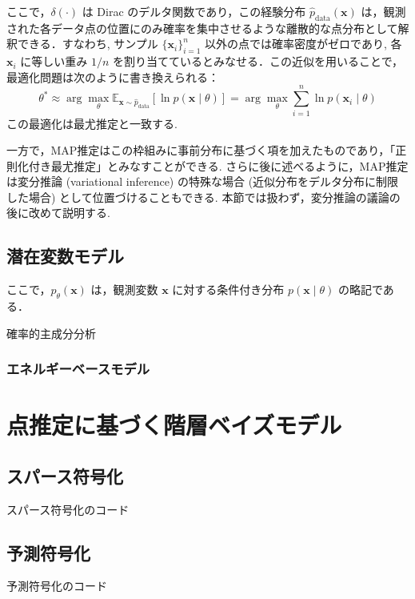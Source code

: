 \documentclass[titlepage]{ltjsbook}
\begin{document}
ここで，$\delta(\cdot)$ は Dirac のデルタ関数であり，この経験分布 $\hat{p}_{\mathrm{data}}(\mathbf{x})$ は，観測された各データ点の位置にのみ確率を集中させるような離散的な点分布として解釈できる．すなわち, サンプル $\{\mathbf{x}_i\}_{i=1}^n$ 以外の点では確率密度がゼロであり, 各 $\mathbf{x}_i$ に等しい重み $1/n$ を割り当てているとみなせる．この近似を用いることで，最適化問題は次のように書き換えられる：
\begin{equation}
\theta^* \approx \arg\max_\theta \mathbb{E}_{\mathbf{x} \sim \hat{p}_{\mathrm{data}}} \left[ \ln p(\mathbf{x}\mid \theta) \right]
= \arg\max_\theta \sum_{i=1}^n \ln p(\mathbf{x}_i \mid \theta)
\end{equation}
この最適化は最尤推定と一致する. 

一方で，MAP推定はこの枠組みに事前分布に基づく項を加えたものであり，「正則化付き最尤推定」とみなすことができる. さらに後に述べるように，MAP推定は変分推論 (variational inference) の特殊な場合 (近似分布をデルタ分布に制限した場合) として位置づけることもできる. 本節では扱わず，変分推論の議論の後に改めて説明する. 

\subsection{潜在変数モデル}
ここで，$p_\theta(\mathbf{x})$ は，観測変数 $\mathbf{x}$ に対する条件付き分布 $p(\mathbf{x} \mid \theta)$ の略記である．

確率的主成分分析
\subsubsection{エネルギーベースモデル}

\section{点推定に基づく階層ベイズモデル}

\subsection{スパース符号化}


\begin{tcolorbox}
スパース符号化のコード
\end{tcolorbox}

\subsection{予測符号化}
\begin{tcolorbox}
予測符号化のコード
\end{tcolorbox}
\end{document}
